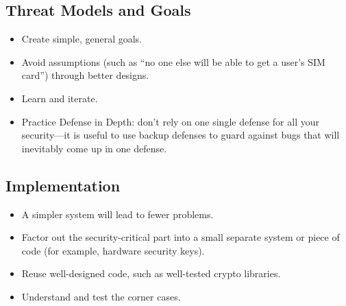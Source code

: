 \subsection{Threat Models and Goals}
\begin{itemize}
	\item Create simple, general goals.
	\item Avoid assumptions (such as ``no one else will be able to get a user's SIM card'') through better designs.
	\item Learn and iterate.
	\item Practice Defense in Depth: don't rely on one single defense for all your security---it is useful to use backup defenses to guard against bugs that will inevitably come up in one defense.
\end{itemize}

\subsection{Implementation}
\begin{itemize}
	\item A simpler system will lead to fewer problems.
	\item Factor out the security-critical part into a small separate system or piece of code (for example, hardware security keys).
	\item Reuse well-designed code, such as well-tested crypto libraries.
	\item Understand and test the corner cases.
\end{itemize}



